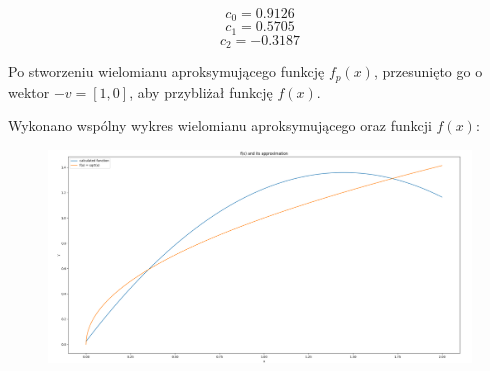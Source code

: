 \documentclass{article}
\begin{document}
	$$c_0 = 0.9126$$
	$$c_1 = 0.5705$$
	$$c_2 = -0.3187$$
	
	Po stworzeniu wielomianu aproksymującego funkcję $f_p(x)$, przesunięto go o wektor $-v = [1, 0]$, aby przybliżał funkcję $f(x)$. 
	
	
	Wykonano wspólny wykres wielomianu aproksymującego oraz funkcji $f(x)$:
	
	
	\begin{figure}[h]
    		\centering
  		\includegraphics[scale = 0.3]{wykres2.png}
	\end{figure}
	
	
	
	
	
	
	
	
	
	
	
	
	
	
	
	
	
	
	
	
	
	
	
	
	
	
	
	
	
	
	
\end{document}

